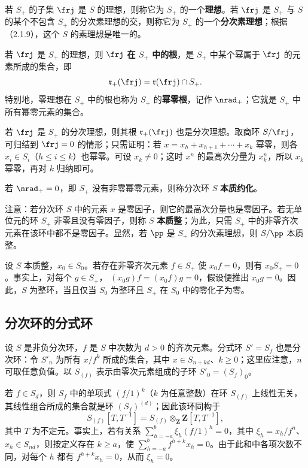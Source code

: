 若 $S_+$ 的子集 $\frj$ 是 $S$ 的理想，则称它为 $S_+$ 的一个\textbf{理想}。若 $\frj$ 是 $S_+$ 与 $S$ 的某个不包含 $S_+$ 的分次素理想的交，则称它为 $S_+$ 的一个\textbf{分次素理想}；根据（2.1.9），这个 $S$ 的素理想是唯一的。

若 $\frj$ 是 $S_+$ 的理想，则 $\frj$ \textbf{在 $S_+$ 中的根}，是 $S_+$ 中某个幂属于 $\frj$ 的元素所成的集合，即
\[
\mathfrak r_+(\frj)=\mathfrak r(\frj)\cap S_+.
\]
特别地，零理想在 $S_+$ 中的根也称为 $S_+$ 的\textbf{幂零根}，记作 $\nrad_+$；它就是 $S_+$ 中所有幂零元素的集合。

若 $\frj$ 是 $S_+$ 的分次理想，则其根 $\mathfrak r_+(\frj)$ 也是分次理想。取商环 $S/\frj$，可归结到 $\frj=0$ 的情形；只需证明：若
$x=x_h+x_{h+1}+\cdots+x_k$ 幂零，则各 $x_i\in S_i$（$h\leq i\leq k$）也幂零。可设 $x_k\ne0$；这时 $x^n$ 的最高次分量为 $x_k^n$，所以 $x_k$ 幂零，再对 $k$ 归纳即可。

若 $\nrad_+=0$，即 $S_+$ 没有非零幂零元素，则称分次环 $S$ \textbf{本质约化}。

注意：若分次环 $S$ 中的元素 $x$ 是零因子，则它的最高次分量也是零因子。若无单位元的环 $S_+$ 非零且没有零因子，则称 $S$ \textbf{本质整}；为此，只需 $S_+$ 中的非零齐次元素在该环中都不是零因子。显然，若 $\pp$ 是 $S_+$ 的分次素理想，则 $S/\pp$ 本质整。

设 $S$ 本质整，$x_0\in S_0$。若存在非零齐次元素 $f\in S_+$ 使 $x_0f=0$，则有 $x_0S_+=0$。事实上，对每个 $g\in S_+$，
$(x_0g)f=(x_0f)g=0$，假设便推出 $x_0g=0$。因此，$S$ 为整环，当且仅当 $S_0$ 为整环且 $S_+$ 在 $S_0$ 中的零化子为零。

\subsection{分次环的分式环}
设 $S$ 是非负分次环，$f$ 是 $S$ 中次数为 $d>0$ 的齐次元素。分式环 $S'=S_f$ 也是分次环：令 $S'_n$ 为所有 $x/f^k$ 所成的集合，其中
$x\in S_{n+kd}$、$k\geq0$；这里应注意，$n$ 可取任意负值。以 $S_{(f)}$ 表示由零次元素组成的子环 $S'_0=(S_f)_0$。

若 $f\in S_d$，则 $S_f$ 中的单项式 $(f/1)^k$（$k$ 为任意整数）在环 $S_{(f)}$ 上线性无关，其线性组合所成的集合就是环 $(S_f)^{(d)}$；因此该环同构于
\[
S_{(f)}[T,T^{-1}]=S_{(f)}\otimes_{\mathbf Z}\mathbf Z[T,T^{-1}],
\]
其中 $T$ 为不定元。事实上，若有关系
$\sum_{h=-a}^{b}\xi_h(f/1)^h=0$，其中 $\xi_h=x_h/f^n$、$x_h\in S_{nd}$，则按定义存在 $k\geq a$，使
$\sum_{h=-a}^{b}f^{h+k}x_h=0$。由于此和中各项次数不同，对每个 $h$ 都有 $f^{h+k}x_h=0$，从而 $\xi_h=0$。

